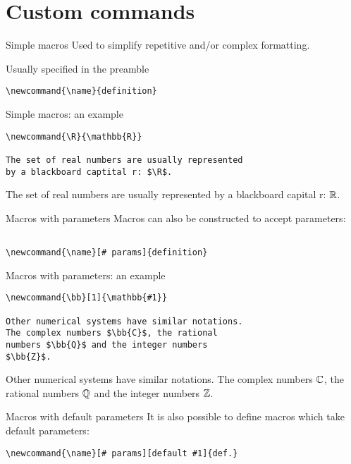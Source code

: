\section{Custom commands}

\begin{frame}[fragile]{Simple macros}
  Used to simplify repetitive and/or complex formatting.

  Usually specified in the preamble
  \begin{lstlisting}
\newcommand{\name}{definition}
  \end{lstlisting}
\end{frame}

\begin{frame}[fragile]{Simple macros: an example}
  \begin{lstlisting}
\newcommand{\R}{\mathbb{R}}

The set of real numbers are usually represented
by a blackboard captital r: $\R$.
  \end{lstlisting}

  The set of real numbers are usually represented by a blackboard capital r:
  $\R$.
\end{frame}

\begin{frame}[fragile]{Macros with parameters}
  Macros can also be constructed to accept parameters:
  \begin{lstlisting}

\newcommand{\name}[# params]{definition}
  \end{lstlisting}
\end{frame}

\begin{frame}[fragile]{Macros with parameters: an example}
  \begin{lstlisting}
\newcommand{\bb}[1]{\mathbb{#1}}

Other numerical systems have similar notations. 
The complex numbers $\bb{C}$, the rational 
numbers $\bb{Q}$ and the integer numbers
$\bb{Z}$.

  \end{lstlisting}
  Other numerical systems have similar notations. The complex numbers $\bb{C}$,
  the rational numbers $\bb{Q}$ and the integer numbers $\bb{Z}$.
\end{frame}

\begin{frame}[fragile]{Macros with default parameters}
  It is also possible to define macros which take default parameters:
  \begin{lstlisting}
\newcommand{\name}[# params][default #1]{def.}

  \end{lstlisting}
\end{frame}

